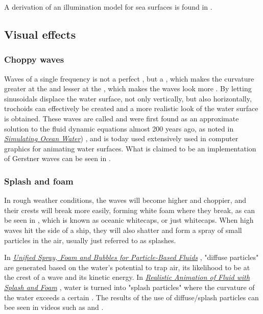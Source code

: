 A derivation of an illumination model for sea surfaces is found in .

\subsection{Visual effects}

\subsubsection{Choppy waves}

Waves of a single frequency is not a perfect \sinusoidal, but a \trochoid, which makes the curvature greater at the  and lesser at the , which makes the waves look more . By letting sinusoidals displace the water surface, not only vertically, but also horizontally, trochoids can effectively be created and a more realistic look of the water surface is obtained. These waves are called  and were first found as an approximate solution to the fluid dynamic equations almost 200 years ago, as noted in \textit{\href{http://graphics.ucsd.edu/courses/rendering/2005/jdewall/tessendorf.pdf}{Simulating Ocean Water}}) \citep{temp}, and is today used extensively used in computer graphics for animating water surfaces. What is claimed to be an implementation of Gerstner waves can be seen in \citep{ceribral2012}.

\subsubsection{Splash and foam}

In rough weather conditions, the waves will become higher and choppier, and their crests will break more easily, forming white foam where they break, as can be seen in , which is known as oceanic whitecaps, or just whitecaps. When high waves hit the side of a ship, they will also shatter and form a spray of small particles in the air, usually just referred to as splashes.

In \textit{\href{http://cg.informatik.uni-freiburg.de/publications/2012_CGI_sprayFoamBubbles.pdf}{Unified Spray, Foam and Bubbles for Particle-Based Fluids}} \citep{temp}, "diffuse particles" are generated based on the water's potential to trap air, its likelihood to be at the crest of a wave and its kinetic energy. In \textit{\href{http://nguyendangbinh.org/Proceedings/Eurographics/2003/cgf/volume22/issue3/paper127/paper127.pdf}{Realistic Animation of Fluid with Splash and Foam}} \citep{temp}, water is turned into "splash particles" where the curvature of the water exceeds a certain \threshold. The results of the use of diffuse/splash particles can bee seen in videos such as and \citep{RealFlowLabs2011,Chandel2009}.

